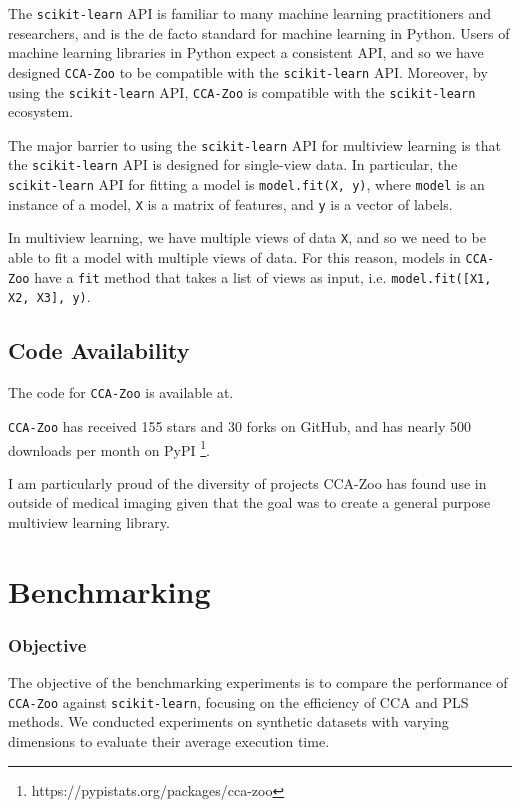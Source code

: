 The \texttt{scikit-learn} API is familiar to many machine learning practitioners and researchers, and is the de facto standard for machine learning in Python.
Users of machine learning libraries in Python expect a consistent API, and so we have designed \texttt{CCA-Zoo} to be compatible with the \texttt{scikit-learn} API.
Moreover, by using the \texttt{scikit-learn} API, \texttt{CCA-Zoo} is compatible with the \texttt{scikit-learn} ecosystem.

The major barrier to using the \texttt{scikit-learn} API for multiview learning is that the \texttt{scikit-learn} API is designed for single-view data.
In particular, the \texttt{scikit-learn} API for fitting a model is \texttt{model.fit(X, y)}, where \texttt{model} is an instance of a model, \texttt{X} is a matrix of features, and \texttt{y} is a vector of labels.

In multiview learning, we have multiple views of data \texttt{X}, and so we need to be able to fit a model with multiple views of data.
For this reason, models in \texttt{CCA-Zoo} have a \texttt{fit} method that takes a list of views as input, i.e. \texttt{model.fit([X1, X2, X3], y)}.

\subsection{Code Availability}

The code for \texttt{CCA-Zoo} is available at.

\texttt{CCA-Zoo} has received 155 stars and 30 forks on GitHub, and has nearly 500 downloads per month on PyPI \footnote{https://pypistats.org/packages/cca-zoo}.

I am particularly proud of the diversity of projects CCA-Zoo has found use in outside of medical imaging given that the goal was to create a general purpose multiview learning library.


\section{Benchmarking}

\subsubsection{Objective}
The objective of the benchmarking experiments is to compare the performance of \texttt{CCA-Zoo} against \texttt{scikit-learn}, focusing on the efficiency of CCA and PLS methods.
We conducted experiments on synthetic datasets with varying dimensions to evaluate their average execution time.

